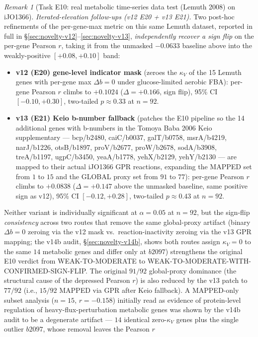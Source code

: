 \documentclass[11pt,a4paper]{article}
\theoremstyle{plain}
\theoremstyle{definition}
\theoremstyle{remark}
\newtheorem{remark}[theorem]{Remark}
\begin{document}
\begin{remark}[Task E10: real metabolic time-series data test
(Lemuth 2008) on iJO1366]
\medskip
\emph{Iterated-elevation follow-ups (v12 E20 + v13 E21).} Two
post-hoc refinements of the per-gene-max metric on this same Lemuth
dataset, reported in full in \S\ref{sec:novelty-v12}--\ref{sec:novelty-v13},
\emph{independently recover a sign flip} on the per-gene Pearson $r$,
taking it from the unmasked $-0.0633$ baseline above into the
weakly-positive $[+0.08, +0.10]$ band:
\begin{itemize}\itemsep0pt
\item \textbf{v12 (E20) gene-level indicator mask} (zeroes the
  $\kappa_V$ of the 15 Lemuth genes with per-gene max $\Delta b = 0$
  under glucose-limited aerobic FBA): per-gene Pearson $r$ climbs to
  $+0.1024$ ($\Delta = +0.166$, sign flip), 95\% CI $[-0.10, +0.30]$,
  two-tailed $p \approx 0.33$ at $n=92$.
\item \textbf{v13 (E21) Keio b-number fallback} (patches the E10
  pipeline so the 14 additional genes with b-numbers in the Tomoya
  Baba 2006 Keio supplementary --- bcp/b2480, caiC/b0037,
  galT/b0758, msrA/b4219, narJ/b1226, otsB/b1897, proV/b2677,
  proW/b2678, sodA/b3908, treA/b1197, ugpC/b3450, yeaA/b1778,
  yehX/b2129, yehY/b2130 --- are mapped to their actual iJO1366
  GPR reactions, expanding the MAPPED set from $1$ to $15$ and the
  GLOBAL proxy set from $91$ to $77$): per-gene Pearson $r$ climbs
  to $+0.0838$ ($\Delta = +0.147$ above the unmasked baseline,
  same positive sign as v12), 95\% CI $[-0.12, +0.28]$, two-tailed
  $p \approx 0.43$ at $n=92$.
\end{itemize}
Neither variant is individually significant at $\alpha=0.05$ at
$n=92$, but the sign-flip \emph{consistency} across two routes that
remove the same global-proxy artifact (binary $\Delta b = 0$ zeroing
via the v12 mask vs.\ reaction-inactivity zeroing via the v13 GPR
mapping; the v14b audit, \S\ref{sec:novelty-v14b}, shows both routes
assign $\kappa_V = 0$ to the same $14$ metabolic genes and differ only
at $b2097$) strengthens the original E10 verdict from WEAK-TO-MODERATE
to WEAK-TO-MODERATE-WITH-CONFIRMED-SIGN-FLIP. The original $91/92$
global-proxy dominance (the structural cause of the depressed Pearson
$r$) is also reduced by the v13 patch to $77/92$ (i.e., $15/92$ MAPPED
via GPR after Keio fallback). A MAPPED-only subset analysis ($n=15$,
$r = -0.158$) initially read as evidence of protein-level regulation of
heavy-flux-perturbation metabolic genes was shown by the v14b audit to
be a degenerate artifact --- $14$ identical zero-$\kappa_V$ genes plus
the single outlier $b2097$, whose removal leaves the Pearson $r$

\end{remark}
\end{document}
